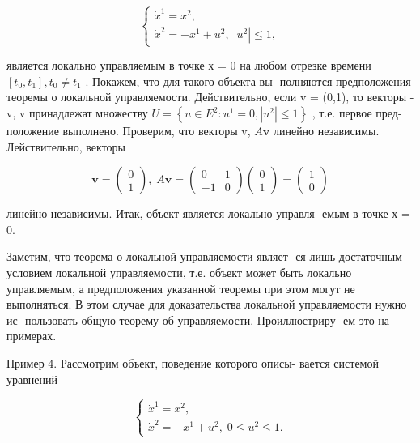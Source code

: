 \documentclass[8pt]{extarticle}
\begin{document}
\[
\left\{  \begin{array}{l} {\dot{x}}^{1} = {x}^{2}, \\  {\dot{x}}^{2} =  - {x}^{1} + {u}^{2},\;\left| {u}^{2}\right|  \leq  1, \end{array}\right.
\]

является локально управляемым в точке х = 0 на любом отрезке времени \(\left\lbrack  {{t}_{0},{t}_{1}}\right\rbrack  ,{t}_{0} \neq  {t}_{1}\) . Покажем, что для такого объекта вы- полняются предположения теоремы о локальной управляемости. Действительно, если v = (0,1), то векторы - v, v принадлежат множеству \(U = \left\{  {u \in  {E}^{2} : {u}^{1} = 0,\left| {u}^{2}\right|  \leq  1}\right\}\) , т.е. первое пред- положение выполнено. Проверим, что векторы v, \(A\mathbf{v}\) линейно независимы. Лействительно, векторы

\[
\mathbf{v} = \left( \begin{array}{l} 0 \\  1 \end{array}\right) ,\;A\mathbf{v} = \left( \begin{array}{rr} 0 & 1 \\   - 1 & 0 \end{array}\right) \left( \begin{array}{l} 0 \\  1 \end{array}\right)  = \left( \begin{array}{l} 1 \\  0 \end{array}\right)
\]

линейно независимы. Итак, объект является локально управля- емым в точке х = 0.

Заметим, что теорема о локальной управляемости являет- ся лишь достаточным условием локальной управляемости, т.е. объект может быть локально управляемым, а предположения указанной теоремы при этом могут не выполняться. В этом случае для доказательства локальной управляемости нужно ис- пользовать общую теорему об управляемости. Проиллюстриру- ем это на примерах.

Пример 4. Рассмотрим объект, поведение которого описы- вается системой уравнений

\[
\left\{  \begin{array}{l} {\dot{x}}^{1} = {x}^{2}, \\  {\dot{x}}^{2} =  - {x}^{1} + {u}^{2},\;0 \leq  {u}^{2} \leq  1. \end{array}\right. \tag{8.18}
\]
\end{document}
